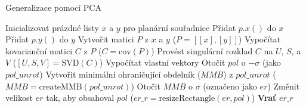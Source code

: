 \documentclass{article}
\begin{document}
\begin{algorithm}
\caption{Generalizace pomocí PCA}
\label{alg:create_erpca}
\begin{algorithmic}[1]
\STATE Inicializovat prázdné listy $x$ a $y$ pro planární souřadnice
  \STATE Přidat $p.x()$ do $x$
  \STATE Přidat $p.y()$ do $y$
\ENDFOR
\STATE Vytvořit matici $P$ z $x$ a $y$ ($P = [[x], [y]]$)
\STATE Vypočítat kovarianční matici $C$ z $P$ ($C = \text{cov}(P)$)
\STATE Provést singulární rozklad $C$ na $U$, $S$, a $V$ ($[U, S, V] = \text{SVD}(C)$)
\STATE Vypočítat vlastní vektory
\STATE Otočit $pol$ o $-\sigma$ (jako $pol\_unrot$)
\STATE Vytvořit minimální ohraničující obdelník ($MMB$) z $pol\_unrot$ ($MMB = \text{createMMB}(pol\_unrot)$)
\STATE Otočit $MMB$ o $\sigma$ (označeno jako $er$)
\STATE Změnit velikost $er$ tak, aby obsahoval $pol$ ($er\_r = \text{resizeRectangle}(er, pol)$)
\STATE \textbf{Vrať} $er\_r$
\end{algorithmic}
\end{algorithm}
\end{document}
